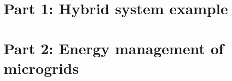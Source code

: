 \documentclass[a4paper]{article}
\begin{document}
\section{Part 1: Hybrid system example}



\section{Part 2: Energy management of microgrids}










\newpage







\newpage
\begin{appendices}

\newpage

\newpage

\newpage

\newpage

\end{appendices}
\end{document}
